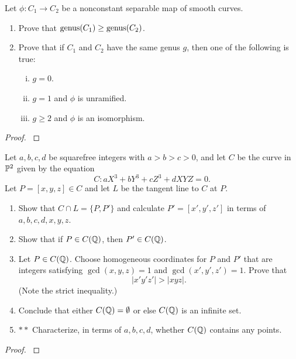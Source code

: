 \documentclass[12pt,reqno]{amsart}
\begin{document}
\begin{exe}\label{2.8}
Let $\phi: C_1 \to C_2$ be a nonconstant separable map of smooth curves.
\begin{enumerate}
\item
Prove that ${\operatorname{genus}}(C_1)\geq {\operatorname{genus}}(C_2)$.

\item
Prove that if $C_1$ and $C_2$ have the same genus $g$, then one of the following is true:
\begin{enumerate}[(i)]
\item
$g=0$.
\item
$g=1$ and $\phi$ is unramified.
\item
$g \geq 2$ and $\phi$ is an isomorphism.
\end{enumerate}
\end{enumerate}
\begin{proof}\label{s2.8}

\end{proof} 
\end{exe} 

\begin{exe}\label{2.9}
Let $a, b, c, d$ be squarefree integers with $a>b>c>0$, and let $C$ be the curve in ${\mathbb P}^2$ given by the equation
\[
C: aX^3+bY^3+cZ^3+dXYZ=0.
\]
Let $P=[x, y, z]\in C$ and let $L$ be the tangent line to $C$ at $P$.
\begin{enumerate}
\item
Show that $C \cap L = \{P, P'\}$ and calculate $P'=[x', y', z']$ in terms of $a, b, c, d, x, y, z$.

\item
Show that if $P\in C({\mathbb Q})$, then $P'\in C({\mathbb Q})$.

\item
Let $P\in C({\mathbb Q})$.  Choose homogeneous coordinates for $P$ and $P'$ that are integers satisfying $\gcd(x, y, z)=1$ and $\gcd(x', y', z')=1$.  Prove that
\[
|x'y'z'|>|xyz|.
\]
(Note the strict inequality.)

\item
Conclude that either $C({\mathbb Q})=\emptyset$ or else $C({\mathbb Q})$ is an infinite set.

\item
$\ast\ast$  Characterize, in terms of $a, b, c, d$, whether $C({\mathbb Q})$ contains any points.

\end{enumerate}
\begin{proof}\label{s2.9}

\end{proof} 
\end{exe} 
\end{document}
